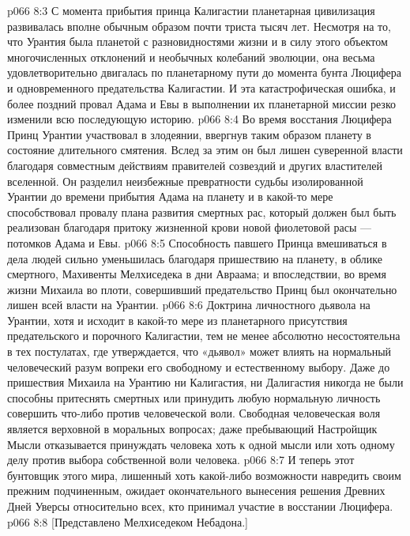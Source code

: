 \vs p066 8:3 \pc С момента прибытия принца Калигастии планетарная цивилизация развивалась вполне обычным образом почти триста тысяч лет. Несмотря на то, что Урантия была планетой с разновидностями жизни и в силу этого объектом многочисленных отклонений и необычных колебаний эволюции, она весьма удовлетворительно двигалась по планетарному пути до момента бунта Люцифера и одновременного предательства Калигастии. И эта катастрофическая ошибка, и более поздний провал Адама и Евы в выполнении их планетарной миссии резко изменили всю последующую историю.
\vs p066 8:4 Во время восстания Люцифера Принц Урантии участвовал в злодеянии, ввергнув таким образом планету в состояние длительного смятения. Вслед за этим он был лишен суверенной власти благодаря совместным действиям правителей созвездий и других властителей вселенной. Он разделил неизбежные превратности судьбы изолированной Урантии до времени прибытия Адама на планету и в какой\hyp{}то мере способствовал провалу плана развития смертных рас, который должен был быть реализован благодаря притоку жизненной крови новой фиолетовой расы --- потомков Адама и Евы.
\vs p066 8:5 Способность павшего Принца вмешиваться в дела людей сильно уменьшилась благодаря пришествию на планету, в облике смертного, Махивенты Мелхиседека в дни Авраама; и впоследствии, во время жизни Михаила во плоти, совершивший предательство Принц был окончательно лишен всей власти на Урантии.
\vs p066 8:6 \pc Доктрина личностного дьявола на Урантии, хотя и исходит в какой\hyp{}то мере из планетарного присутствия предательского и порочного Калигастии, тем не менее абсолютно несостоятельна в тех постулатах, где утверждается, что «дьявол» может влиять на нормальный человеческий разум вопреки его свободному и естественному выбору. Даже до пришествия Михаила на Урантию ни Калигастия, ни Далигастия никогда не были способны притеснять смертных или принудить любую нормальную личность совершить что\hyp{}либо против человеческой воли. Свободная человеческая воля является верховной в моральных вопросах; даже пребывающий Настройщик Мысли отказывается принуждать человека хоть к одной мысли или хоть одному делу против выбора собственной воли человека.
\vs p066 8:7 И теперь этот бунтовщик этого мира, лишенный хоть какой\hyp{}либо возможности навредить своим прежним подчиненным, ожидает окончательного вынесения решения Древних Дней Уверсы относительно всех, кто принимал участие в восстании Люцифера.
\vsetoff
\vs p066 8:8 [Представлено Мелхиседеком Небадона.]
